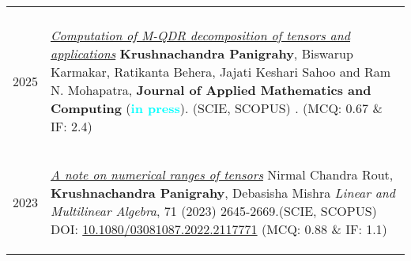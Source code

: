 \documentclass[a4paper,12pt]{article}
\begin{document}
\begin{longtable}{lp{15cm}}
\multicolumn{2}{l}{\color{pub}{\textsc{Published}}}\\[0.2cm]
\textsc{2025}&
\vspace{-0.5cm}
\begin{etaremune}[start=8]
\item \href{https://arxiv.org/abs/2409.08743}{\it Computation of M-QDR decomposition of tensors and applications}\newline
{\footnotesize
{\bf Krushnachandra Panigrahy}, Biswarup Karmakar, 
Ratikanta Behera, Jajati Keshari Sahoo and Ram N. Mohapatra, \newline
{\bf Journal of Applied Mathematics and Computing} (\textcolor{cyan}{\bf in press}). \hfill{(SCIE, SCOPUS)}\newline
. \hfill(MCQ: 0.67 $\&$ IF: 2.4)
}

\end{etaremune}\\[-0.5cm]
\textsc{2023}&
\vspace{-0.5cm}
\begin{etaremune}[start=7]
\item \href{https://doi.org/10.1080/03081087.2022.2117771}{\it A note on numerical ranges of tensors}\newline
{\footnotesize
Nirmal Chandra Rout, {\bf Krushnachandra Panigrahy}, Debasisha Mishra \newline
{\it Linear and Multilinear Algebra}, 71 (2023) 2645-2669.\hfill{(SCIE, SCOPUS)} \newline
DOI: \href{https://doi.org/10.1080/03081087.2022.2117771}{10.1080/03081087.2022.2117771} \hfill(MCQ: 0.88 $\&$ IF: 1.1)
}


\end{etaremune}
\end{longtable}
\end{document}
